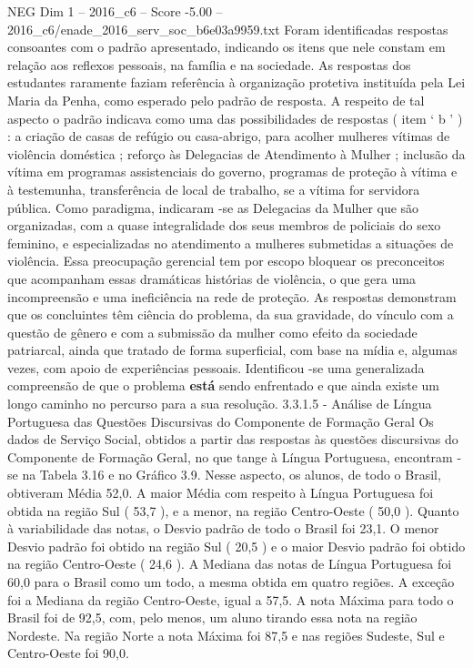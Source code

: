 \begin{textsample}{NEG Dim 1 – 2016\_c6 – Score -5.00 – 2016\_c6/enade\_2016\_serv\_soc\_b6e03a9959.txt}
Foram identificadas respostas consoantes com o padrão apresentado, indicando os itens que nele constam em relação aos reflexos pessoais, na família e na sociedade.
As respostas dos estudantes raramente faziam referência à organização protetiva instituída pela Lei Maria da Penha, como esperado pelo padrão de resposta.
A respeito de tal aspecto o padrão indicava como uma das possibilidades de respostas ( item ‘ b ’ ) : a criação de casas de refúgio ou casa-abrigo, para acolher mulheres vítimas de violência doméstica ; reforço às Delegacias de Atendimento à Mulher ; inclusão da vítima em programas assistenciais do governo, programas de proteção à vítima e à testemunha, transferência de local de trabalho, se a vítima for servidora pública.
Como paradigma, indicaram -se as Delegacias da Mulher que são organizadas, com a quase integralidade dos seus membros de policiais do sexo feminino, e especializadas no atendimento a mulheres submetidas a situações de violência.
Essa preocupação gerencial tem por escopo bloquear os preconceitos que acompanham essas dramáticas histórias de violência, o que gera uma incompreensão e uma ineficiência na rede de proteção.
As respostas demonstram que os concluintes têm ciência do problema, da sua gravidade, do vínculo com a questão de gênero e com a submissão da mulher como efeito da sociedade patriarcal, ainda que tratado de forma superficial, com base na mídia e, algumas vezes, com apoio de experiências pessoais.
Identificou -se uma generalizada compreensão de que o problema \textbf{está} sendo enfrentado e que ainda existe um longo caminho no percurso para a sua resolução. 3.3.1.5 - Análise de Língua Portuguesa das Questões Discursivas do Componente de Formação Geral Os dados de Serviço Social, obtidos a partir das respostas às questões discursivas do Componente de Formação Geral, no que tange à Língua Portuguesa, encontram -se na Tabela 3.16 e no Gráfico 3.9.
Nesse aspecto, os alunos, de todo o Brasil, obtiveram Média 52,0.
A maior Média com respeito à Língua Portuguesa foi obtida na região Sul ( 53,7 ), e a menor, na região Centro-Oeste ( 50,0 ).
Quanto à variabilidade das notas, o Desvio padrão de todo o Brasil foi 23,1.
O menor Desvio padrão foi obtido na região Sul ( 20,5 ) e o maior Desvio padrão foi obtido na região Centro-Oeste ( 24,6 ).
A Mediana das notas de Língua Portuguesa foi 60,0 para o Brasil como um todo, a mesma obtida em quatro regiões.
A exceção foi a Mediana da região Centro-Oeste, igual a 57,5.
A nota Máxima para todo o Brasil foi de 92,5, com, pelo menos, um aluno tirando essa nota na região Nordeste.
Na região Norte a nota Máxima foi 87,5 e nas regiões Sudeste, Sul e Centro-Oeste foi 90,0.

\end{textsample}
